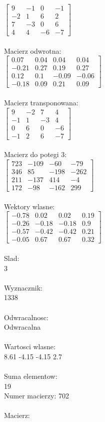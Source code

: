 \documentclass[a4paper,12pt]{article}
\begin{document}
$\begin{bmatrix} 9&-1&0&-1\\-2&1&6&2\\7&-3&0&6\\4&4&-6&-7 \end{bmatrix}$
\\
\\
Macierz odwrotna:\\

$\begin{bmatrix} 0.07&0.04&0.04&0.04\\-0.21&0.27&0.19&0.27\\0.12&0.1&-0.09&-0.06\\-0.18&0.09&0.21&0.09 \end{bmatrix}$
\\
\\
Macierz transponowana:\\

$\begin{bmatrix} 9&-2&7&4\\-1&1&-3&4\\0&6&0&-6\\-1&2&6&-7 \end{bmatrix}$
\\
\\
Macierz do potegi 3:\\

$\begin{bmatrix} 723&-109&-60&-79\\346&85&-198&-262\\211&-137&414&-4\\172&-98&-162&299 \end{bmatrix}$
\\
\\
Wektory wlasne:\\

$\begin{bmatrix} -0.78&0.02&0.02&0.19\\-0.26&-0.18&-0.18&0.9\\-0.57&-0.42&-0.42&0.21\\-0.05&0.67&0.67&0.32 \end{bmatrix}$
\\
\\
Slad:\\
3
\\
\\
Wyznacznik:\\
1338
\\
\\
Odwracalnosc:\\
Odwracalna
\\
\\
Wartosci wlasne:\\
8.61 -4.15 -4.15 2.7
\\
\\
Suma elementow:\\
19
\\
\newpage
Numer macierzy:
702
\\
\\
Macierz:\\
\end{document}
